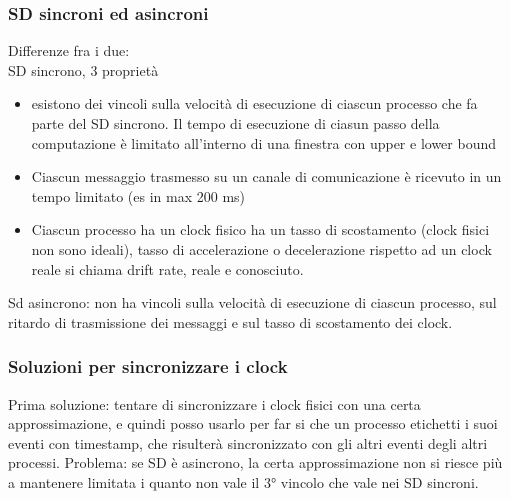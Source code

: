 \documentclass{article}
\begin{document}
\subsubsection{SD sincroni ed asincroni}
Differenze fra i due:\\
SD sincrono, 3 proprietà
\begin{itemize}
\item esistono dei vincoli sulla velocità di esecuzione di ciascun processo che fa parte del SD sincrono. Il tempo di esecuzione di ciasun passo della computazione è limitato all'interno di una finestra con upper e lower bound
\item Ciascun messaggio trasmesso su un canale di comunicazione è ricevuto in un tempo limitato (es in max 200 ms)
\item Ciascun processo ha un clock fisico ha un tasso di scostamento (clock fisici non sono ideali), tasso di accelerazione  o decelerazione rispetto ad un clock reale si chiama drift rate, reale e conosciuto.
\end{itemize}
Sd asincrono: non ha vincoli sulla velocità di esecuzione di ciascun processo, sul ritardo di trasmissione dei messaggi e sul tasso di scostamento dei clock.
\subsubsection{Soluzioni per sincronizzare i clock}
Prima soluzione: tentare di sincronizzare i clock fisici con una certa approssimazione, e quindi posso usarlo per far si che un processo etichetti i suoi eventi con timestamp, che risulterà sincronizzato con gli altri eventi degli altri processi. Problema: se SD è asincrono, la certa approssimazione non si riesce più a mantenere limitata i quanto non vale il 3° vincolo che vale nei SD sincroni.
\end{document}
